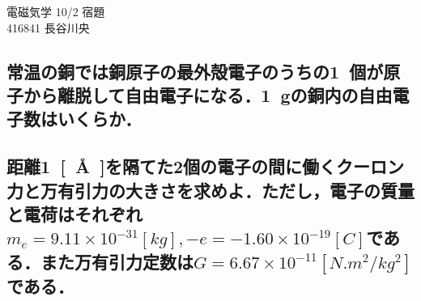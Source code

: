 \documentclass[a4j,12pt]{jsarticle}
\begin{document}
\begin{center}
    \begin{LARGE}
        {\huge 電磁気学 10/2 宿題}\vspace{0.2em}\\ 416841 長谷川央
    \end{LARGE}
\end{center}

\subsection{常温の銅では銅原子の最外殻電子のうちの\SI{1}{個}が原子から離脱して自由電子になる．\SI{1}{g}の銅内の自由電子数はいくらか．}

\vspace{20em}
\subsection{距離\SI{1}{[\AA]}を隔てた2個の電子の間に働くクーロン力と万有引力の大きさを求めよ．ただし，電子の質量と電荷はそれぞれ \(m_e=9.11\times10^{-31}[\si{kg}], -e=-1.60\times10^{-19}[\si{C}]\)である．また万有引力定数は\(G=6.67\times10^{-11}[\si{N.m^2/kg^2}]\)である．}
\end{document}
